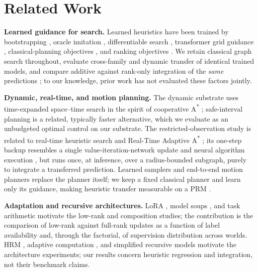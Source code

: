 \documentclass[letterpaper]{article} %
\begin{document}
\section{Related Work}

\textbf{Learned guidance for search.} Learned heuristics have been trained by bootstrapping \citep{arfaee2011bootstrap}, oracle imitation \citep{bhardwaj2017sail}, differentiable search \citep{yonetani2021neuralastar}, transformer grid guidance \citep{kirilenko2023transpath}, classical-planning objectives \citep{ferber2020neural}, and ranking objectives \citep{chrestien2023rank}. We retain classical graph search throughout, evaluate cross-family and dynamic transfer of identical trained models, and compare additive against rank-only integration of the \emph{same} predictions \citep{pohl1970,pearl1982semiadmissible,aine2016mha}; to our knowledge, prior work has not evaluated these factors jointly.

\textbf{Dynamic, real-time, and motion planning.} The dynamic substrate uses time-expanded space--time search in the spirit of cooperative A\textsuperscript{*} \citep{silver2005cooperative}; safe-interval planning \citep{phillips2011sipp} is a related, typically faster alternative, which we evaluate as an unbudgeted optimal control on our substrate. The restricted-observation study is related to real-time heuristic search \citep{korf1990rta} and Real-Time Adaptive A\textsuperscript{*} \citep{koenig2006rtaa}; its one-step backup resembles a single value-iteration-network update \citep{tamar2016vin,lee2018gppn} and neural algorithm execution \citep{velickovic2021nar}, but runs once, at inference, over a radius-bounded subgraph, purely to integrate a transferred prediction. Learned samplers and end-to-end motion planners \citep{ichter2018sampling,qureshi2019mpnet} replace the planner itself; we keep a fixed classical planner and learn only its guidance, making heuristic transfer measurable on a PRM \citep{kavraki1996prm}.

\textbf{Adaptation and recursive architectures.} LoRA \citep{hu2021lora}, model soups \citep{wortsman2022soups}, and task arithmetic \citep{ilharco2022task} motivate the low-rank and composition studies; the contribution is the comparison of low-rank against full-rank updates as a function of label availability and, through the factorial, of supervision distribution across worlds. HRM \citep{wang2025hrm}, adaptive computation \citep{graves2016act,banino2021pondernet}, and simplified recursive models \citep{jolicoeur2025trm} motivate the architecture experiments; our results concern heuristic regression and integration, not their benchmark claims.
\end{document}
